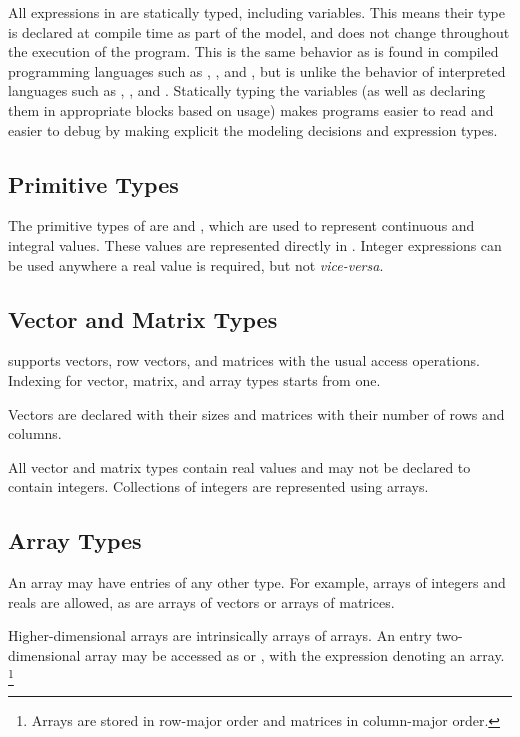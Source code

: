 \documentclass[article]{jss}
\begin{document}
All expressions in  are statically typed, including
variables.  This means their type is declared at compile time as part
of the model, and does not change throughout the execution of the
program.  This is the same behavior as is found in compiled
programming languages such as , ,
and , but is unlike the behavior of interpreted
languages such as , , and
.  Statically typing the variables (as well as
declaring them in appropriate blocks based on usage) makes
 programs easier to read and easier to debug by making
explicit the modeling decisions and expression types.

\subsection{Primitive Types}

The primitive types of  are  and ,
which are used to represent continuous and integral values.  These
values are represented directly in .  Integer
expressions can be used anywhere a real value is required, but not
{\it vice-versa}.

\subsection{Vector and Matrix Types}

 supports vectors, row vectors, and matrices with the
usual access operations.  Indexing for vector, matrix, and array types
starts from one.  

Vectors are declared with their sizes and matrices with their number
of rows and columns.

All vector and matrix types contain real values and may not be
declared to contain integers.  Collections of integers are represented
using arrays.

\subsection{Array Types}

An array may have entries of any other type.  For example, arrays of
integers and reals are allowed, as are arrays of vectors or arrays of
matrices.  

Higher-dimensional arrays are intrinsically arrays of arrays.  An
entry two-dimensional array  may be accessed as 
or , with the expression  denoting an array.%
%
\footnote{ Arrays are stored in row-major order and matrices in
  column-major order.}
\end{document}
